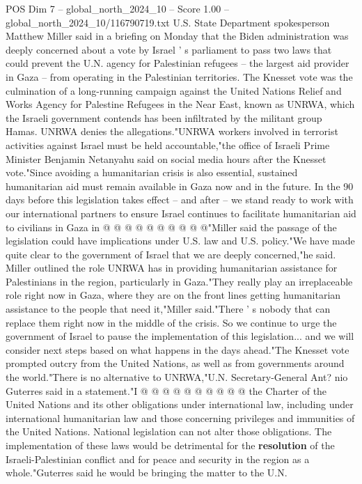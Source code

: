 \begin{textsample}{POS Dim 7 – global\_north\_2024\_10 – Score 1.00 – global\_north\_2024\_10/116790719.txt}  \label{ex:f7_pos_415}
U.S.
State Department spokesperson Matthew Miller said in a briefing on Monday that the Biden administration was deeply concerned about a vote by Israel ' s parliament to pass two laws that could prevent the U.N. agency for Palestinian refugees -- the largest aid provider in Gaza -- from operating in the Palestinian territories.
The Knesset vote was the culmination of a long-running campaign against the United Nations Relief and Works Agency for Palestine Refugees in the Near East, known as UNRWA, which the Israeli government contends has been infiltrated by the militant group Hamas.
UNRWA denies the allegations."UNRWA workers involved in terrorist activities against Israel must be held accountable,"the office of Israeli Prime Minister Benjamin Netanyahu said on social media hours after the Knesset vote."Since avoiding a humanitarian crisis is also essential, sustained humanitarian aid must remain available in Gaza now and in the future.
In the 90 days before this legislation takes effect -- and after -- we stand ready to work with our international partners to ensure Israel continues to facilitate humanitarian aid to civilians in Gaza in @ @ @ @ @ @ @ @ @ @"Miller said the passage of the legislation could have implications under U.S. law and U.S. policy."We have made quite clear to the government of Israel that we are deeply concerned,"he said.
Miller outlined the role UNRWA has in providing humanitarian assistance for Palestinians in the region, particularly in Gaza."They really play an irreplaceable role right now in Gaza, where they are on the front lines getting humanitarian assistance to the people that need it,"Miller said."There ' s nobody that can replace them right now in the middle of the crisis.
So we continue to urge the government of Israel to pause the implementation of this legislation... and we will consider next steps based on what happens in the days ahead."The Knesset vote prompted outcry from the United Nations, as well as from governments around the world."There is no alternative to UNRWA,"U.N.
Secretary-General Ant? nio Guterres said in a statement."I @ @ @ @ @ @ @ @ @ @ the Charter of the United Nations and its other obligations under international law, including under international humanitarian law and those concerning privileges and immunities of the United Nations.
National legislation can not alter those obligations.
The implementation of these laws would be detrimental for the \textbf{resolution} of the Israeli-Palestinian conflict and for peace and security in the region as a whole."Guterres said he would be bringing the matter to the U.N.

\end{textsample}

